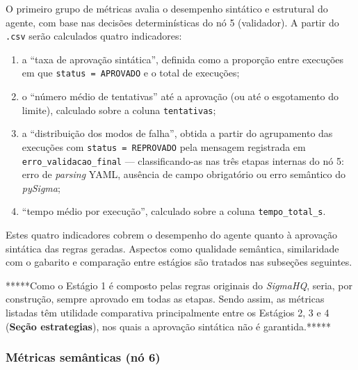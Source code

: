O primeiro grupo de métricas avalia o desempenho sintático e estrutural do agente, com base nas decisões determinísticas do nó 5 (validador). 
A partir do \texttt{.csv} serão calculados quatro indicadores: 
\begin{enumerate}
	\item a ``taxa de aprovação sintática'', definida como a proporção entre execuções em que \texttt{status = APROVADO} e o total de execuções; 
	
	\item o ``número médio de tentativas'' até a aprovação (ou até o esgotamento do limite), calculado sobre a coluna \texttt{tentativas}; 
	
	\item a ``distribuição dos modos de falha'', obtida a partir do agrupamento das execuções com \texttt{status = REPROVADO} pela mensagem registrada em \texttt{erro\_validacao\_final} --- classificando-as nas três etapas internas do nó 5: erro de \textit{parsing} YAML, ausência de campo obrigatório ou erro semântico do \textit{pySigma}; 
	
	\item ``tempo médio por execução'', calculado sobre a coluna \texttt{tempo\_total\_s}.
\end{enumerate} 
Estes quatro indicadores cobrem o desempenho do agente quanto à aprovação sintática das regras geradas. 
Aspectos como qualidade semântica, similaridade com o gabarito e comparação entre estágios são tratados nas subseções seguintes.

*****Como o Estágio 1 é composto pelas regras originais do \textit{SigmaHQ}, seria, por construção, sempre aprovado em todas as etapas. 
Sendo assim, as métricas listadas têm utilidade comparativa principalmente entre os Estágios 2, 3 e 4 (\textbf{Seção estrategias}), nos quais a aprovação sintática não é garantida.*****


\subsubsection{Métricas semânticas (nó 6)}

